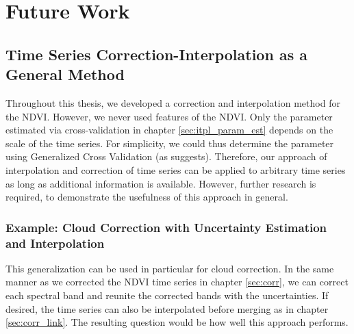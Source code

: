 \section{Future Work}{
    \label{ss:FutureWork}

    \subsection{Time Series Correction-Interpolation as a General Method}{
        Throughout this thesis, we developed a correction and interpolation method for the NDVI. However, we never used features of the NDVI. Only the parameter estimated via cross-validation in chapter \ref{sec:itpl_param_est} depends on the scale of the time series. For simplicity, we could thus determine the parameter using Generalized Cross Validation (as  suggests). Therefore, our approach of interpolation and correction of time series can be applied to arbitrary time series as long as additional information is available. However, further research is required, to demonstrate the usefulness of this approach in general.


        \subsubsection*{Example: Cloud Correction with Uncertainty Estimation and Interpolation}
            This generalization can be used in particular for cloud correction. In the same manner as we corrected the NDVI time series in chapter \ref{sec:corr}, we can correct each spectral band and reunite the corrected bands with the uncertainties. If desired, the time series can also be interpolated before merging as in chapter \ref{sec:corr_link}. The resulting question would be how well this approach performs.
    }



}
